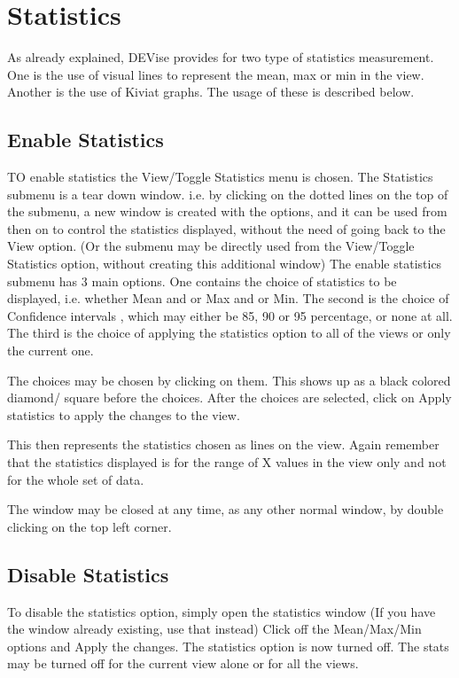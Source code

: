 \section{Statistics}

As already explained, DEVise provides for two type of statistics measurement. One is the use of visual lines to represent the mean, max or min in the view. Another is the use of Kiviat graphs. The usage of these is described below.

\subsection{Enable Statistics}

TO enable statistics the View/Toggle Statistics menu is chosen. The Statistics submenu is a tear down window. i.e. by clicking on the dotted lines on the top of the submenu, a new window is created with the options, and it can be used from then on to control the statistics displayed, without the need of going back to the View option. (Or the submenu may be directly used from the View/Toggle Statistics option, without creating this additional window) The enable statistics submenu has 3 main options. One contains the choice of statistics to be displayed, i.e. whether Mean and or Max and or Min. The second is the choice of Confidence intervals , which may either be 85, 90 or 95 percentage, or none at all. The third is the choice of applying the statistics option to all of the views or only the current one.

The choices may be chosen by clicking on them. This shows up as a black colored diamond/ square  before the choices. After the choices are selected, click on Apply statistics to apply the changes to the view.

This then represents the statistics chosen as lines on the view. Again remember that the statistics displayed is for the range of X values in the view only and not for the whole set of data.

The window may be closed at any time, as any other normal window, by double clicking on the top left corner.

\subsection{Disable Statistics}

To disable the statistics option, simply open the statistics window (If you have the window already existing, use that instead) Click off the Mean/Max/Min options and Apply the changes. The statistics option is now turned off. The stats may be turned off for the current view alone or for all the views.


